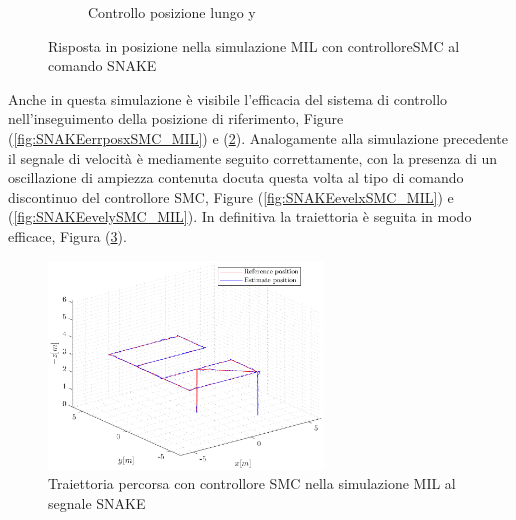 \begin{figure}
\begin{subfigure}{0.45\textwidth}
		\caption{Controllo posizione lungo y}
		\label{fig:SNAKEerrposySMC_MIL}
	\end{subfigure}
	\caption{Risposta in posizione nella simulazione MIL con controlloreSMC al comando SNAKE}
\end{figure}

Anche in questa simulazione è visibile l'efficacia del sistema di controllo nell'inseguimento della posizione di riferimento, Figure (\ref{fig:SNAKEerrposxSMC_MIL}) e (\ref{fig:SNAKEerrposySMC_MIL}). Analogamente alla simulazione precedente il segnale di velocità è mediamente seguito correttamente, con la presenza di un oscillazione di ampiezza contenuta docuta questa volta al tipo di comando discontinuo del controllore SMC, Figure (\ref{fig:SNAKEevelxSMC_MIL}) e (\ref{fig:SNAKEevelySMC_MIL}). In definitiva la traiettoria è seguita in modo efficace, Figura (\ref{fig:SNAKEetraSMC_MIL}).

\begin{figure}
	\centering
	\includegraphics[width=0.65\textwidth]{Simulazioni/Figure/SMC/SNAKE_MIL/Trajectory}
	\caption{Traiettoria percorsa con controllore SMC nella simulazione MIL al segnale SNAKE}
	\label{fig:SNAKEetraSMC_MIL}
\end{figure}

